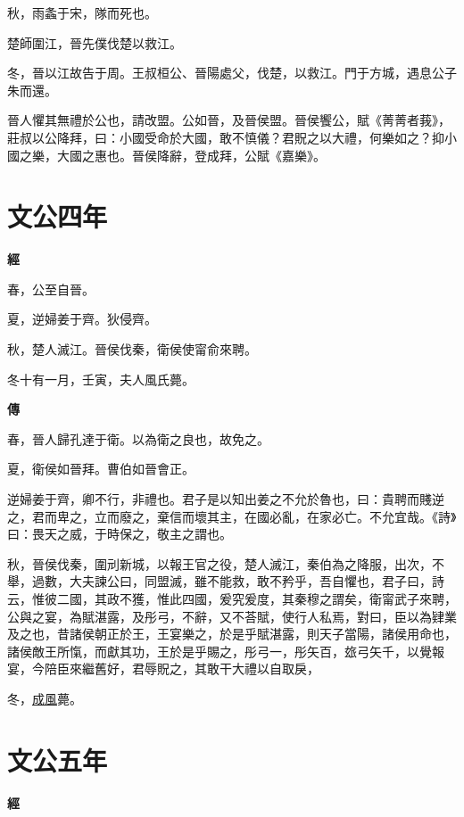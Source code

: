 \documentclass{ctexart}
\begin{document}
秋，雨螽于宋，隊而死也。

楚師圍江，晉先僕伐楚以救江。

冬，晉以江故告于周。王叔桓公、晉陽處父，伐楚，以救江。門于方城，遇息公子朱而還。

晉人懼其無禮於公也，請改盟。公如晉，及晉侯盟。晉侯饗公，賦《菁菁者莪》，莊叔以公降拜，曰：小國受命於大國，敢不慎儀？君貺之以大禮，何樂如之？抑小國之樂，大國之惠也。晉侯降辭，登成拜，公賦《嘉樂》。





\section{文公四年}


\textbf{經}



春，公至自晉。

夏，逆婦姜于齊。狄侵齊。

秋，楚人滅江。晉侯伐秦，衛侯使甯俞來聘。

冬十有一月，壬寅，夫人風氏薨。

\textbf{傳}



春，晉人歸孔達于衛。以為衛之良也，故免之。

夏，衛侯如晉拜。曹伯如晉會正。

逆婦姜于齊，卿不行，非禮也。君子是以知出姜之不允於魯也，曰：貴聘而賤逆之，君而卑之，立而廢之，棄信而壞其主，在國必亂，在家必亡。不允宜哉。《詩》曰：畏天之威，于時保之，敬主之謂也。

秋，晉侯伐秦，圍刓新城，以報王官之役，楚人滅江，秦伯為之降服，出次，不舉，過數，大夫諫公曰，同盟滅，雖不能救，敢不矜乎，吾自懼也，君子曰，詩云，惟彼二國，其政不獲，惟此四國，爰究爰度，其秦穆之謂矣，衛甯武子來聘，公與之宴，為賦湛露，及彤弓，不辭，又不荅賦，使行人私焉，對曰，臣以為肄業及之也，昔諸侯朝正於王，王宴樂之，於是乎賦湛露，則天子當陽，諸侯用命也，諸侯敵王所愾，而獻其功，王於是乎賜之，彤弓一，彤矢百，玈弓矢千，以覺報宴，今陪臣來繼舊好，君辱貺之，其敢干大禮以自取戾，

冬，\underline{成風}薨。





\section{文公五年}


\textbf{經}
\end{document}
